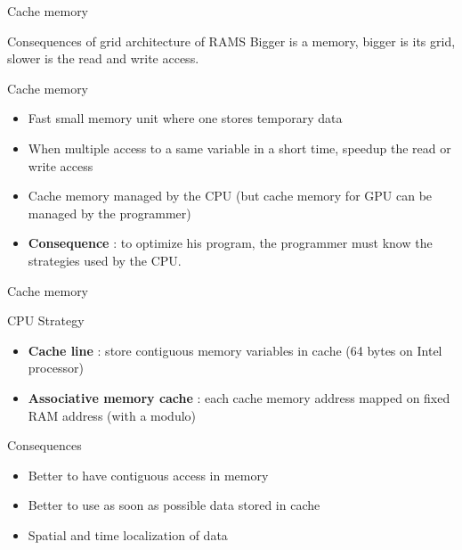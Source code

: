 \documentclass[compress,10pt,aspectratio=169]{beamer}
\begin{document}
\begin{frame}[fragile]{Cache memory}
    \begin{block}{Consequences of grid architecture of RAMS}
        Bigger is a memory, bigger is its grid, slower is the read and write access.
    \end{block}

    \begin{exampleblock}{Cache memory}
        \begin{itemize}
            \item Fast small memory unit where one stores temporary data
            \item When multiple access to a same variable \alert{in a short time}, speedup the read or write access
            \item Cache memory managed by the CPU (but cache memory for GPU can be managed by the programmer)
            \item \textbf{Consequence} : to optimize his program, the programmer must know the strategies used by the CPU.
        \end{itemize}
    \end{exampleblock}
\end{frame}


\begin{frame}[fragile]{Cache memory}
    \begin{block}{CPU Strategy}
        \begin{itemize}
            \item \textbf{Cache line} : store contiguous memory variables in cache (64 bytes on Intel processor)
            \item \textbf{Associative memory cache} : each cache memory address mapped on fixed RAM address (with a modulo)
        \end{itemize}
    \end{block}

    \begin{alertblock}{Consequences}
        \begin{itemize}
            \item Better to have contiguous access in memory
            \item Better to use as soon as possible data stored in cache
            \item \alert{Spatial and time localization of data}
        \end{itemize}
    \end{alertblock}
\end{frame}
\end{document}
